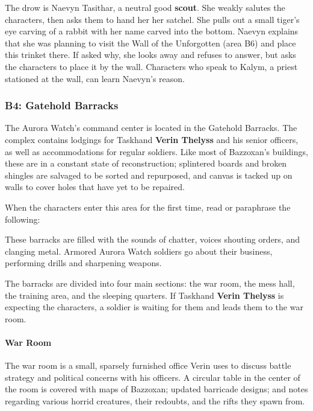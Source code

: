 \documentclass[a4paper, 11pt, bg=full, twocolumn, nooutline]{dndbook}
\begin{document}
The drow is Naevyn Tasithar, a neutral good \textbf{scout}. She weakly salutes the characters, then asks them to hand her her satchel. She pulls out a small tiger's eye carving of a rabbit with her name carved into the bottom. Naevyn explains that she was planning to visit the Wall of the Unforgotten (area B6) and place this trinket there. If asked why, she looks away and refuses to answer, but asks the characters to place it by the wall. Characters who speak to Kalym, a priest stationed at the wall, can learn Naevyn's reason.

\subsubsection{B4: Gatehold Barracks}

The Aurora Watch's command center is located in the Gatehold Barracks. The complex contains lodgings for Taskhand \textbf{Verin Thelyss} and his senior officers, as well as accommodations for regular soldiers. Like most of Bazzoxan's buildings, these are in a constant state of reconstruction; splintered boards and broken shingles are salvaged to be sorted and repurposed, and canvas is tacked up on walls to cover holes that have yet to be repaired.

When the characters enter this area for the first time, read or paraphrase the following:

\begin{DndReadAloud}
These barracks are filled with the sounds of chatter, voices shouting orders, and clanging metal. Armored Aurora Watch soldiers go about their business, performing drills and sharpening weapons.
\end{DndReadAloud}

The barracks are divided into four main sections: the war room, the mess hall, the training area, and the sleeping quarters. If Taskhand \textbf{Verin Thelyss} is expecting the characters, a soldier is waiting for them and leads them to the war room.

\paragraph{War Room}

The war room is a small, sparsely furnished office Verin uses to discuss battle strategy and political concerns with his officers. A circular table in the center of the room is covered with maps of Bazzoxan; updated barricade designs; and notes regarding various horrid creatures, their redoubts, and the rifts they spawn from.
\end{document}
